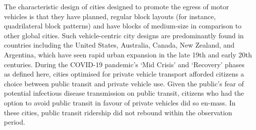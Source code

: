 \documentclass[preprint,10pt]{elsarticle} %
\begin{document}
The characteristic design of cities designed to promote the egress of motor vehicles is that they have planned, regular block layouts (for instance, quadrilateral block patterns) and have blocks of medium-size in comparison to other global cities\cite{Thompson2020}. Such vehicle-centric city designs are predominantly found in countries including the United States, Australia, Canada, New Zealand, and Argentina, which have seen rapid urban expansion in the late 19th and early 20th centuries. During the COVID-19 pandemic's `Mid Crisis' and `Recovery' phases as defined here, cities optimised for private vehicle transport afforded citizens a choice between public transit and private vehicle use. Given the public's fear of potential infectious disease transmission on public transit\cite{fernando2023shaping}, citizens who had the option to avoid public transit in favour of private vehicles did so en-mass. In these cities, public transit ridership did not rebound within the observation period. 
\end{document}
